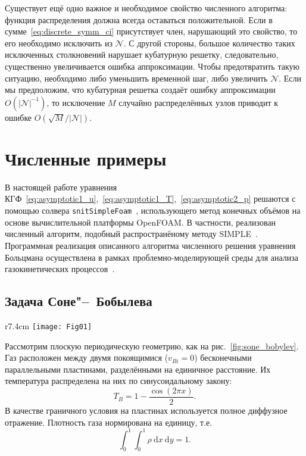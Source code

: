 \documentclass[
aps,%
12pt,%
final,%
notitlepage,%
oneside,%
onecolumn,%
nobibnotes,%
nofootinbib,%
superscriptaddress,%
noshowpacs,%
showkeys,%
centertags]%
{revtex4}
\newcommand{\dd}{\:\mathrm{d}}
\newcommand{\OO}[1]{O\left(#1\right)}
\begin{document}
Существует ещё одно важное и необходимое свойство численного алгоритма:
функция распределения должна всегда оставаться положительной.
Если в сумме~\eqref{eq:discrete_symm_ci} присутствует член, нарушающий это свойство,
то его необходимо исключить из \(\mathcal{N}\).
С другой стороны, большое количество таких исключенных столкновений
нарушает кубатурную решетку, следовательно, существенно увеличивается ошибка аппроксимации.
Чтобы предотвратить такую ситуацию, необходимо либо уменьшить временной шаг, либо увеличить \(\mathcal{N}\).
Если мы предположим, что кубатурная решетка создаёт ошибку аппроксимации \(\OO{|\mathcal{N}|^{-1}}\),
то исключение \(M\) случайно распределённых узлов приводит к ошибке \(\OO{\sqrt{M}/|\mathcal{N}|}\).

\section{Численные примеры}

В настоящей работе уравнения КГФ~\eqref{eq:asymptotic1_u},~\eqref{eq:asymptotic1_T},~\eqref{eq:asymptotic2_p}
решаются с помощью солвера \verb+snitSimpleFoam+~\cite{Rogozin2014},
использующего метод конечных объёмов на основе вычислительной платформы OpenFOAM\textregistered{}.
В частности, реализован численный алгоритм, подобный распространёному методу SIMPLE~\cite{Aoki2007}.
Программная реализация описанного алгоритма численного решения уравнения Больцмана
осуществлена в рамках проблемно-моделирующей среды
для анализа газокинетических процессов~\cite{Kloss2011, Kloss2012}.

\subsection{Задача Соне"--~Бобылева}

\begin{wrapfigure}{r}{7.4cm}
    \vspace{-10pt}
    \centering
    \texttt{[image: Fig01]}
    \vspace{-20pt}
    \caption{Геометрия задачи}\label{fig:sone_bobylev}
    \vspace{20pt}
\end{wrapfigure}

Рассмотрим плоскую периодическую геометрию, как на рис.~\ref{fig:sone_bobylev}.
Газ расположен между двумя покоящимися (\(v_{Bi} = 0\)) бесконечными параллельными пластинами,
разделёнными на единичное расстояние. Их температура распределена на них по синусоидальному закону:
\begin{equation}
    T_B = 1 - \frac{\cos(2\pi x)}{2}.
\end{equation}
В качестве граничного условия на пластинах используется полное диффузное отражение.
Плотность газа нормирована на единицу, т.е.
\begin{equation}\label{eq:total_mass}
    \int_0^1\int_0^1\rho\dd{x}\dd{y} = 1.
\end{equation}
\end{document}
